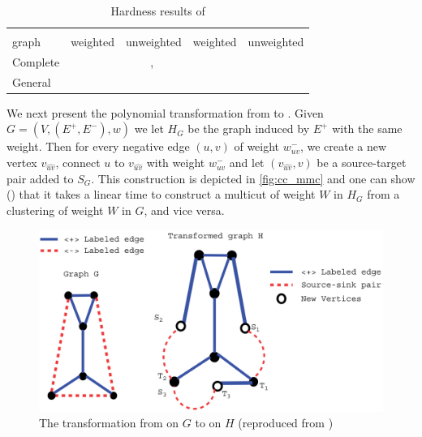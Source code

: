 \begin{table}[b]
   \centering
   \small
   \caption{Hardness results of \pcc{}} \label{tab:cc_cpx}
   \begin{tabulary}{187mm}{lCCCC}
      \toprule
               &    &                                    \\
      \cmidrule(r){2-3}
      \cmidrule(r){4-5}
      graph    & weighted                      & unweighted                                                     & weighted                                                     & unweighted                   \\
      \midrule
      Complete & \APXh{}~\autocite{Charikar2003} & \NPc{}~\autocite{Bansal2002}, \APXh{}~\autocite{Charikar2003}  &                                                              & \NPc{}~\autocite{Bansal2002} \\
      General  & \APXh{}~\autocites{Charikar2003}{Demaine2003} &  \APXh{}~\autocites{Charikar2003}{Emanuel2003}   &  \\
      \bottomrule
   \end{tabulary}
\end{table}

We next present the polynomial transformation from \pcc{} to \mmc{}. Given $G=(V, (E^+, E^-), w)$ we let
$H_G$ be the graph induced by $E^+$ with the same weight. Then for every negative edge $(u,v)$ of
weight $w_{uv}^-$, we create a new vertex $v_{\widehat{uv}}$, connect $u$ to $v_{\widehat{uv}}$ with
weight $w_{uv}^-$ and let $(v_{\widehat{uv}}, v)$ be a source-target pair added to $S_G$. This
construction is depicted in \autoref{fig:cc_mmc} and one can show (\autocite[Theorem
4.4]{Demaine2006}) that it takes a linear time to construct a
multicut of weight $W$ in $H_G$ from a clustering of weight $W$ in $G$, and vice versa.

\begin{figure}[htpb]
   \centering
   \includegraphics[width=0.8\linewidth]{assets/raw/cc_to_mmc.png}
   \caption{The transformation from \pcc{} on $G$ to \mmc{} on $H$ (reproduced from
   \autocite{Demaine2006}) \label{fig:cc_mmc}}
\end{figure}

